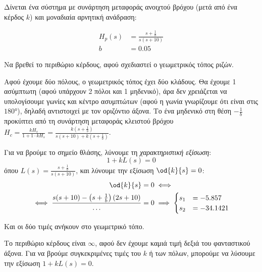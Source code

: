 \documentclass[11pt,a4paper,notitlepage,fleqn,final]{article}
\begin{document}
\begin{exercise}
Δίνεται ένα σύστημα με συνάρτηση μεταφοράς ανοιχτού βρόχου (μετά από ένα κέρδος \( k \)) και
μοναδιαία αρνητική ανάδραση:

\begin{align*}
	H_p(s) &= \frac{s+\frac{1}{b}}{s(s+10)}\\
	b &= 0.05
\end{align*}

Να βρεθεί το περιθώριο κέρδους, αφού σχεδιαστεί ο γεωμετρικός τόπος ριζών.

\tcblower

Αφού έχουμε δύο πόλους, ο γεωμετρικός τόπος έχει δύο κλάδους. Θα έχουμε 1 ασύμπτωτη (αφού
υπάρχουν 2 πόλοι και 1 μηδενικό), άρα δεν χρειάζεται να υπολογίσουμε γωνίες και κέντρο
ασυμπτώτων (αφού η γωνία γνωρίζουμε ότι είναι στις \( \ang{180} \)), δηλαδή αντιστοιχεί
με τον οριζόντιο άξονα. Το ένα μηδενικό στη θέση \( -\frac{1}{b} \) προκύπτει από
τη συνάρτηση μεταφοράς κλειστού βρόχου \( H_c = \frac{kH_s}{1+1\cdot kH_s} = \frac{k\left(s+\frac{1}{b}\right)}{s(s+10)+k\left(s+\frac{1}{b}\right)} \).

Για να βρούμε το σημείο θλάσης, λύνουμε τη \textit{χαρακτηριστική εξίσωση}:
\[
1 + kL(s) = 0
\]
όπου \( L(s) = \displaystyle \frac{s+\frac{1}{b}}{s(s+10)} \), και λύνουμε την
εξίσωση \( \od{k}{s} = 0 \):
\begin{align*}
	\od{k}{s} &= 0 \iff \\
	\iff \frac{s(s+10)-\left(s+\frac{1}{b}\right)(2s+10)}{\dots} &= 0
	\implies \begin{cases}
	s_1 &= -5.857 \\
	s_2 &= -34.1421
	\end{cases}
\end{align*}

Και οι δύο τιμές ανήκουν στο γεωμετρικό τόπο.


Το περιθώριο κέρδους είναι \( \infty \), αφού δεν έχουμε καμιά τιμή δεξιά του φανταστικού άξονα. Για να βρούμε συγκεκριμένες τιμές του \( k \) ή των πόλων, μπορούμε να λύσουμε την
εξίσωση \( 1+kL(s) = 0 \).

\end{exercise}
\end{document}

